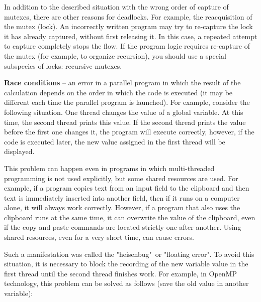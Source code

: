 {	\par In addition to the described situation with the wrong order of capture of mutexes, there are other reasons for deadlocks. For example, the reacquisition of the mutex (lock). An incorrectly written program may try to re-capture the lock it has already captured, without first releasing it. In this case, a repeated attempt to capture completely stops the flow. If the program logic requires re-capture of the mutex (for example, to organize recursion), you should use a special subspecies of locks: recursive mutexes.
	\par\textbf{Race conditions} – an error in a parallel program in which the result of the calculation depends on the order in which the code is executed (it may be different each time the parallel program is launched). For example, consider the following situation. One thread changes the value of a global variable. At this time, the second thread prints this value. If the second thread prints the value before the first one changes it, the program will execute correctly, however, if the code is executed later, the new value assigned in the first thread will be displayed.
	\begin{figure}[H]
		
	\end{figure}
	\par This problem can happen even in programs in which multi-threaded programming is not used explicitly, but some shared resources are used. For example, if a program copies text from an input field to the clipboard and then text is immediately inserted into another field, then if it runs on a computer alone, it will always work correctly. However, if a program that also uses the clipboard runs at the same time, it can overwrite the value of the clipboard, even if the copy and paste commands are located strictly one after another. Using shared resources, even for a very short time, can cause errors.
	\par Such a manifestation was called the "heisenbug"\ or "floating error"{}. To avoid this situation, it is necessary to block the recording of the new variable value in the first thread until the second thread finishes work. For example, in OpenMP technology, this problem can be solved as follows (save the old value in another variable):
	\begin{figure}[H]
		
	\end{figure}
}
